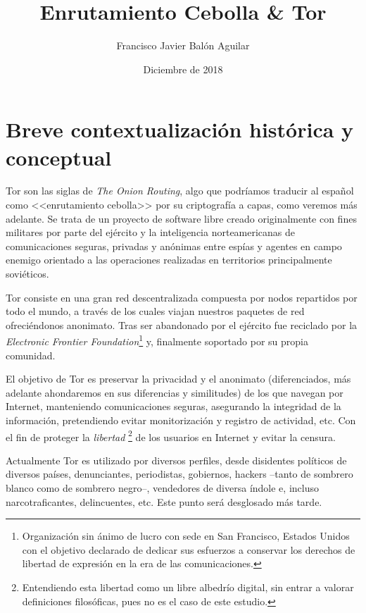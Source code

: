 \documentclass[a4paper, 11pt, titlepage]{article}
\title{\textbf{Enrutamiento Cebolla \& Tor}}
\author{Francisco Javier Balón Aguilar}
\date{Diciembre de 2018}
\begin{document}
\maketitle
\renewcommand{\contentsname}{Índice}
\tableofcontents
\newpage

\section{Breve contextualización histórica y conceptual}

    Tor son las siglas de \emph{The Onion Routing}, algo que podríamos traducir al español como <<enrutamiento cebolla>> 
    por su criptografía a capas, como veremos más adelante. Se trata de un proyecto de software libre creado originalmente 
    con fines militares por parte del ejército y la inteligencia norteamericanas de comunicaciones seguras, privadas y 
    anónimas entre espías y agentes en campo enemigo orientado a las operaciones realizadas en territorios principalmente 
    soviéticos.

    Tor consiste en una gran red descentralizada compuesta por nodos repartidos por todo el mundo, a través de los cuales 
    viajan nuestros paquetes de red ofreciéndonos anonimato. Tras ser abandonado por el ejército fue reciclado por la 
    \emph{Electronic Frontier Foundation}\footnote{Organización sin ánimo de lucro con sede en San Francisco, Estados 
    Unidos con el objetivo declarado de dedicar sus esfuerzos a conservar los derechos de libertad de expresión en la era 
    de las comunicaciones.} y, finalmente soportado por su propia comunidad.

    El objetivo de Tor es preservar la privacidad y el anonimato (diferenciados, más adelante ahondaremos en sus diferencias 
    y similitudes) de los que navegan por Internet, manteniendo comunicaciones seguras, asegurando la integridad de la 
    información, pretendiendo evitar monitorización y registro de actividad, etc. Con el fin de proteger la \emph{libertad}
    \footnote{Entendiendo esta libertad como un libre albedrío digital, sin entrar a valorar definiciones filosóficas, 
    pues no es el caso de este estudio.} de los usuarios en Internet y evitar la censura.

    Actualmente Tor es utilizado por diversos perfiles, desde disidentes políticos de diversos países, denunciantes, 
    periodistas, gobiernos, hackers --tanto de sombrero blanco como de sombrero negro--, vendedores de diversa índole 
    e, incluso narcotraficantes, delincuentes, etc. Este punto será desglosado más tarde.
\end{document}
